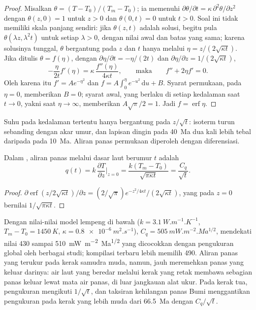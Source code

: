 \begin{proof}
Misalkan $\theta = (T - T_0)/(T_m - T_0)$; ia memenuhi $\partial\theta/\partial t =
\kappa\,\partial^2\theta/\partial z^2$ dengan $\theta(z, 0) = 1$ untuk $z > 0$ dan
$\theta(0, t) = 0$ untuk $t > 0$. Soal ini tidak memiliki skala panjang sendiri:
jika $\theta(z, t)$ adalah solusi, begitu pula $\theta(\lambda z, \lambda^2t)$ untuk setiap
$\lambda > 0$, dengan nilai awal dan batas yang sama; karena solusinya
tunggal, $\theta$ bergantung pada $z$ dan $t$ hanya melalui $\eta = z/(2\sqrt{\kappa
t})$. Jika ditulis $\theta = f(\eta)$, dengan $\partial\eta/\partial t = -\eta/(2t)$ dan
$\partial\eta/\partial z = 1/(2\sqrt{\kappa t})$,
\[
  -\frac{\eta}{2t}f'(\eta) = \kappa\,\frac{f''(\eta)}{4\kappa t},
  \qquad\text{maka}\qquad f'' + 2\eta f' = 0 .
\]
Oleh karena itu $f' = Ae^{-\eta^2}$ dan $f = A\int_0^\eta e^{-u^2}\,\mathrm du + B$. Syarat
permukaan, pada $\eta = 0$, memberikan $B = 0$; syarat awal, yang
berlaku di setiap kedalaman saat $t \to 0$, yakni saat $\eta \to \infty$, memberikan
$A\sqrt\pi/2 = 1$. Jadi $f = \operatorname{erf}\eta$.
\end{proof}

Suhu pada kedalaman tertentu hanya bergantung pada $z/\sqrt t$: isoterm turun
sebanding dengan akar umur, dan lapisan dingin pada \qty{40}{Ma} dua kali
lebih tebal daripada pada \qty{10}{Ma}. Aliran panas permukaan diperoleh dengan diferensiasi.

\begin{proposition}\label{prop:b3:lithosphere-thermal-models:heat-flow}
Dalam , aliran panas melalui dasar laut berumur $t$
adalah
\[
  q(t) = k\,\frac{\partial T}{\partial z}\Big|_{z=0}
  = \frac{k(T_m - T_0)}{\sqrt{\pi\kappa t}} = \frac{C_q}{\sqrt t} .
\]
\end{proposition}

\begin{proof}
$\partial\operatorname{erf}(z/2\sqrt{\kappa t})/\partial z = (2/\sqrt\pi)
e^{-z^2/4\kappa t}/(2\sqrt{\kappa t})$, yang pada $z = 0$ bernilai $1/\sqrt{\pi\kappa
t}$.
\end{proof}

Dengan nilai-nilai model lempeng di bawah ($k = \qty{3.1}{W.m^{-1}.K^{-1}}$,
$T_m - T_0 = \qty{1450}{K}$, $\kappa = \qty{0.8e-6}{m^2.s^{-1}}$), $C_q =
\qty{505}{mW.m^{-2}.Ma^{1/2}}$, mendekati nilai 430 sampai
\qty{510}{mW.m^{-2}.Ma^{1/2}} yang dicocokkan dengan pengukuran global oleh berbagai
studi; kompilasi terbaru lebih memilih \num{490}. Aliran panas yang terukur pada
kerak samudra muda, namun, jauh meremehkan panas yang keluar darinya:
air laut yang beredar melalui kerak yang retak membawa sebagian panas keluar
lewat mata air panas, di luar jangkauan alat ukur. Pada kerak tua, pengukuran
mengikuti $1/\sqrt t$, dan taksiran kehilangan panas Bumi menggantikan
pengukuran pada kerak yang lebih muda dari \qty{66.5}{Ma} dengan $C_q/\sqrt t$.

